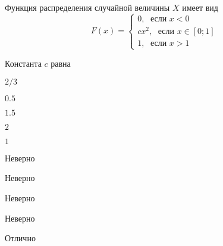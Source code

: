 
\begin{question}
Функция распределения случайной величины \(X\) имеет вид \[
F(x)=\begin{cases}
0, \; \text{ если } x<0 \\
cx^2, \; \text{ если } x\in [0;1] \\
1, \; \text{ если } x>1
\end{cases}
\]

\vspace{0.5cm}

Константа \(c\) равна
\begin{answerlist}
  \item \(2/3\)
  \item \(0.5\)
  \item \(1.5\)
  \item \(2\)
  \item \(1\)
\end{answerlist}
\end{question}

\begin{solution}
\begin{answerlist}
  \item Неверно
  \item Неверно
  \item Неверно
  \item Неверно
  \item Отлично
\end{answerlist}
\end{solution}

